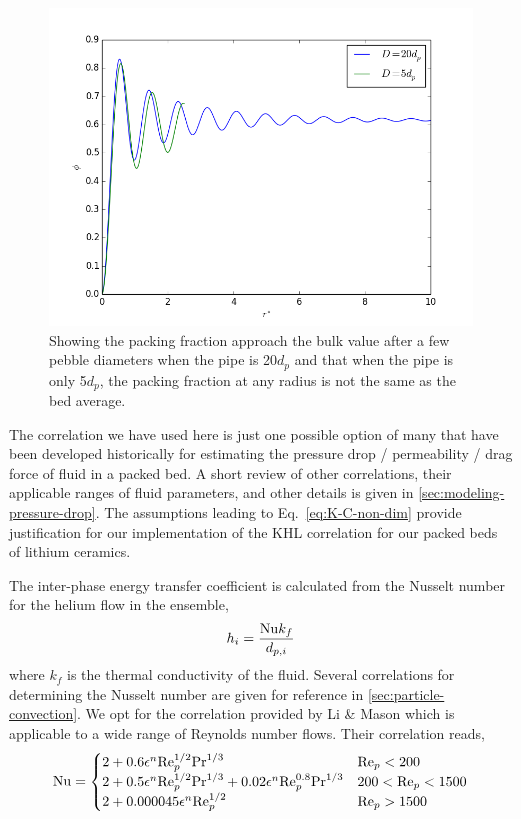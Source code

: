 \begin{figure}[htbp]
\centering
	\includegraphics[width = \singleimagewidth]{chapters/figures/annular-packing-fraction.png}
	\caption{Showing the packing fraction approach the bulk value after a few pebble diameters when the pipe is 20$d_p$ and that when the pipe is only 5$d_p$, the packing fraction at any radius is not the same as the bed average.}
	\label{fig:packingDist}
\end{figure}

The correlation we have used here is just one possible option of many that have been developed historically for estimating the pressure drop / permeability / drag force of fluid in a packed bed. A short review of other correlations, their applicable ranges of fluid parameters, and other details is given in \cref{sec:modeling-pressure-drop}. The assumptions leading to Eq.~\ref{eq:K-C-non-dim} provide justification for our implementation of the KHL correlation for our packed beds of lithium ceramics.
\FloatBarrier



The inter-phase energy transfer coefficient is calculated from the Nusselt number for the helium flow in the ensemble,
\begin{equation}\label{eq:interphase-energy}
	h_i = \frac{\mathrm{Nu} k_f}{d_{p,i}}
\end{equation}
where $k_f$ is the thermal conductivity of the fluid. Several correlations for determining the Nusselt number are given for reference in \cref{sec:particle-convection}. We opt for the correlation provided by Li \& Mason which is applicable to a wide range of Reynolds number flows.\cite{Li2000} Their correlation reads,
\begin{equation}\label{eq:li-mason-correlation}
	\mathrm{Nu} = \begin{cases}
	2+ 0.6\epsilon^n\mathrm{Re}_p^{1/2}\mathrm{Pr}^{1/3} 										& \mathrm{Re}_p < 200\\
	2+ 0.5\epsilon^n\mathrm{Re}_p^{1/2}\mathrm{Pr}^{1/3} + 0.02 \epsilon^n \mathrm{Re}_p^{0.8}\mathrm{Pr}^{1/3} & 200 < \mathrm{Re}_p < 1500\\
	2+ 0.000045\epsilon^n\mathrm{Re}_p^{1/2}			 								& \mathrm{Re}_p > 1500
	\end{cases}
\end{equation}

